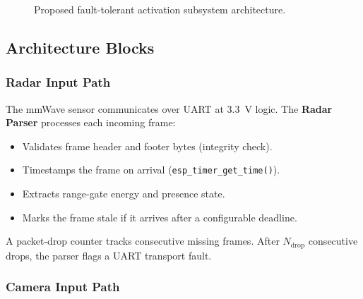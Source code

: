 \documentclass[12pt]{extarticle}
\begin{document}
\begin{figure}[H]
  \caption{Proposed fault-tolerant activation subsystem architecture.}
  \label{fig:arch}
\end{figure}

\subsection{Architecture Blocks}

\subsubsection{Radar Input Path}

The mmWave sensor communicates over UART at 3.3~V logic.
The \textbf{Radar Parser} processes each incoming frame:
\begin{itemize}
  \item Validates frame header and footer bytes (integrity check).
  \item Timestamps the frame on arrival (\texttt{esp\_timer\_get\_time()}).
  \item Extracts range-gate energy and presence state.
  \item Marks the frame stale if it arrives after a configurable deadline.
\end{itemize}

A packet-drop counter tracks consecutive missing frames.
After $N_{\text{drop}}$ consecutive drops, the parser flags a UART transport fault.

\subsubsection{Camera Input Path}
\end{document}
